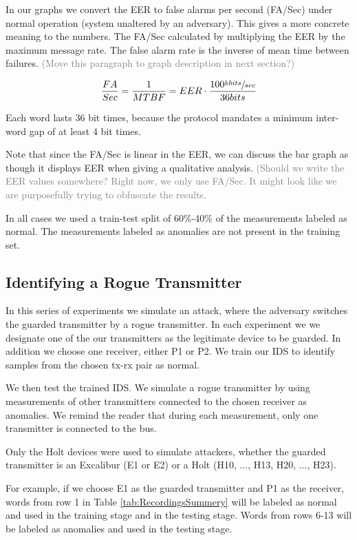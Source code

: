\documentclass[conference]{IEEEtran}
\begin{document}
   In our graphs we convert the EER to false alarms per second (FA/Sec) under normal operation (system unaltered by an adversary). This gives a more concrete meaning to the numbers. The FA/Sec calculated by multiplying the EER by the maximum message rate. The false alarm rate is the inverse of mean time between failures. \textcolor{gray}{(Move this paragraph to graph description in next section?)}
  
  \[\frac{FA}{Sec} = \frac{1}{MTBF} = EER \cdot \frac{100 \sfrac{kbits}{sec}}{36bits}\]
  
  Each word lasts 36 bit times, because the protocol mandates a minimum inter-word gap of at least 4 bit times.
  
  Note that since the FA/Sec is linear in the EER, we can discuss the bar graph as though it displays EER when giving a qualitative analysis. \textcolor{gray}{(Should we write the EER values somewhere? Right now, we only use FA/Sec. It might look like we are purposefully trying to obfuscate the results.}
  
  In all cases we used a train-test split of 60\%-40\% of the measurements labeled as normal. The measurements labeled as anomalies are not present in the training set.
  
\subsection{Identifying a Rogue Transmitter}
  In this series of experiments we simulate an attack, where the adversary switches the guarded transmitter by a rogue transmitter. In each experiment we we designate one of the our transmitters as the legitimate device to be guarded. In addition we choose one receiver, either P1 or P2.  We train our IDS to identify samples from the chosen tx-rx pair as normal.
  
  We then test the trained IDS. We simulate a rogue transmitter by using measurements of other transmitters connected to the chosen receiver as anomalies. We remind the reader that during each measurement, only one transmitter is connected to the bus.
  
  Only the Holt devices were used to simulate attackers, whether the guarded transmitter is an Excalibur (E1 or E2) or a Holt (H10, ..., H13, H20, ..., H23).
  
  For example, if we choose E1 as the guarded transmitter and P1 as the receiver, words from row 1 in Table \ref{tab:RecordingsSummery} will be labeled as normal and used in the training stage and in the testing stage. Words from rows 6-13 will be labeled as anomalies and used in the testing stage.
  
\end{document}
